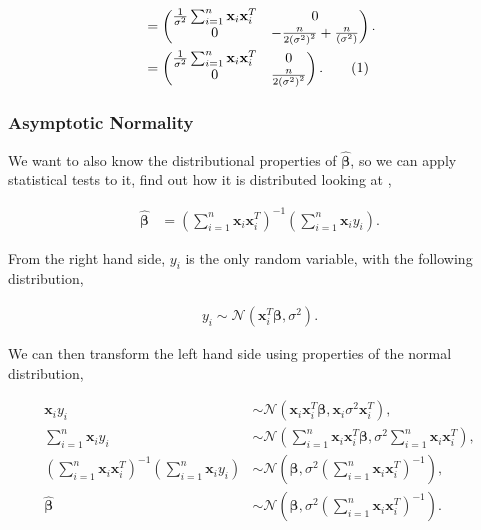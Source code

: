 \documentclass[honours,12pt]{unswthesis}
\newcommand{\s}{\sum_{i=1}^{n}}
\newcommand\numberthis{\addtocounter{equation}{1}\tag{\theequation}}
\numberwithin{equation}{section}
\begin{document}
\begin{align*}
	&= \begin{pmatrix} \frac{1}{\sigma^{2}} \s \mathbf{x}_{i} \mathbf{x}_{i}^{T} &0 \\ 0 & - \frac{n}{2 \left( \sigma^{2} \right)^{2}}  + \frac{n}{\left( \sigma^{2} \right)} \end{pmatrix}.\\
	&= \begin{pmatrix} \frac{1}{\sigma^{2}} \s \mathbf{x}_{i} \mathbf{x}_{i}^{T} &0 \\ 0 & \frac{n}{2 \left( \sigma^{2} \right)^{2}} \end{pmatrix}. \numberthis \label{realfisherinfo}
\end{align*}

\subsubsection{Asymptotic Normality}

We want to also know the distributional properties of $\widehat{\bm{\beta}}$, so we can apply statistical tests to it, find out how it is distributed looking at , 

\begin{align*}
	\widehat{\bm{\beta}} &= \left( \sum_{i = 1}^{n} \mathbf{x}_{i} \mathbf{x}_{i}^{T} \right)^{-1} \left( \sum_{i = 1}^{n} \mathbf{x}_{i} y_{i}\right).
\end{align*}

\noindent From the right hand side, $y_{i}$ is the only random variable, with the following distribution,

\begin{align*}
	y_{i} \sim \mathcal{N} \left( \mathbf{x}_{i}^{T} \bm{\beta}, \sigma^{2} \right).
\end{align*}

\noindent We can then transform the left hand side using properties of the normal distribution,

\begin{align*}
	\mathbf{x}_{i} y_{i} & \sim \mathcal{N} \left( \mathbf{x}_{i} \mathbf{x}_{i}^{T} \bm{\beta}, \mathbf{x}_{i}\sigma^{2} \mathbf{x}_{i}^{T} \right), \\
	\sum_{i = 1}^{n} \mathbf{x}_{i} y_{i} & \sim \mathcal{N} \left( \sum_{i = 1}^{n} \mathbf{x}_{i} \mathbf{x}_{i}^{T} \bm{\beta}, \sigma^{2} \sum_{i = 1}^{n} \mathbf{x}_{i} \mathbf{x}_{i}^{T} \right), \\
	\left( \sum_{i = 1}^{n} \mathbf{x}_{i} \mathbf{x}_{i}^{T} \right)^{-1} \left( \sum_{i = 1}^{n} \mathbf{x}_{i} y_{i} \right) & \sim \mathcal{N} \left(  \bm{\beta} , \sigma^{2} \left( \sum_{i = 1}^{n} \mathbf{x}_{i} \mathbf{x}_{i}^{T} \right)^{-1} \right), \\
	\widehat{\bm{\beta}} & \sim \mathcal{N} \left(  \bm{\beta} , \sigma^{2} \left( \sum_{i = 1}^{n} \mathbf{x}_{i} \mathbf{x}_{i}^{T} \right)^{-1} \right).
\end{align*}
\end{document}
